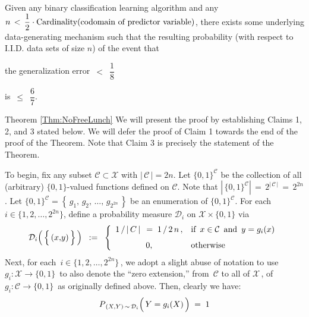 
\newpage
\begin{remark}
\mbox{}\vskip 0.1cm
\noindent
Given any binary classification learning algorithm and
any \,$n \,<\, \dfrac{1}{2}\cdot\textnormal{Cardinality}(\textnormal{codomain of predictor variable})$,
there exists some underlying data-generating mechanism such that
the resulting probability (with respect to I.I.D. data sets of size $n$) of the event that
\begin{center}
the generalization error \,$<$\, $\dfrac{1}{8}$
\end{center}
is \,$\leq$\, $\dfrac{6}{7}$.
\end{remark}


\vskip 1.0cm
\proofof Theorem \ref{Thm:NoFreeLunch}
\vskip 0.3cm
\noindent
We will present the proof by establishing Claims 1, 2, and 3 stated below.
We will defer the proof of Claim 1 towards the end of the proof of the Theorem.
Note that Claim 3 is precisely the statement of the Theorem.

\vskip 0.5cm
\noindent
To begin, fix any subset $\mathcal{C} \subset \mathcal{X}$ with $\vert\,\mathcal{C}\,\vert = 2n$.
Let $\{0,1\}^{\mathcal{C}}$ be the collection of all (arbitrary) $\{0,1\}$-valued functions defined on $\mathcal{C}$.
Note that $\left\vert\,\{0,1\}^{\mathcal{C}}\right\vert \,=\, 2^{\vert\,\mathcal{C}\,\vert} \, = \, 2^{2n}$.
Let $\{0,1\}^{\mathcal{C}} = \left\{\,g_{1},\, g_{2},\, \ldots,\, g_{2^{2n}}\,\right\}$ be an enumeration of $\{0,1\}^{\mathcal{C}}$.
For each $i \in \{1,2,\ldots,2^{2n}\}$, define a probability measure $\mathcal{D}_{i}$ on $\mathcal{X} \times \{0,1\}$ via
\begin{equation*}
\mathcal{D}_{i}\!\left(\,\left\{\,(x\overset{{\color{white}\vert}}{,}y)\,\right\}\,\right)
\;\; := \;\;
	\left\{\begin{array}{cl}
		1\,/\,\vert\,C\,\vert\, \;=\; 1\,/\,2\,n\,, & \textnormal{if \,$x \in \mathcal{C}$\, and \,$y = g_{i}(x)$} \\
		\overset{{\color{white}\vert}}{0}, & \textnormal{otherwise}
		\end{array}\right.
\end{equation*}
Next, for each \,$i \in \{1,2,\ldots,2^{2n}\}$\,, we adopt a slight abuse of notation to use
\,$g_{i} : \mathcal{X} \longrightarrow \{0,1\}$\, to also denote the ``zero extension,''
from \,$\mathcal{C}$ to all of $\mathcal{X}$\,, of \,$g_{i} : \mathcal{C} \longrightarrow \{0,1\}$\,
as originally defined above.
Then, clearly we have:
\begin{equation*}
P_{\,(X,Y)\,\sim\,\mathcal{D}_{i}}\!\left(\,Y \overset{{\color{white}-}}{=} g_{i}(X)\,\right) \; = \; 1
\end{equation*}


